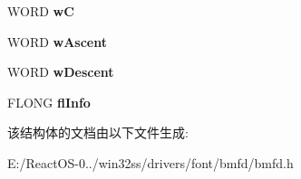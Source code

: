 \begin{DoxyCompactItemize}
W\+O\+RD {\bfseries wC}
\item 
\mbox{\label{struct_b_m_f_d___f_a_c_e_a80c8e617b8ee5163a6fa6d50e58e80d2}} 
W\+O\+RD {\bfseries w\+Ascent}
\item 
\mbox{\label{struct_b_m_f_d___f_a_c_e_a9de517e37955ba9c65bf11d8241448df}} 
W\+O\+RD {\bfseries w\+Descent}
\item 
\mbox{\label{struct_b_m_f_d___f_a_c_e_a82991b7d610a7b451a2a11e4b461bb43}} 
F\+L\+O\+NG {\bfseries fl\+Info}
\end{DoxyCompactItemize}


该结构体的文档由以下文件生成\+:\begin{DoxyCompactItemize}
\item 
E\+:/\+React\+O\+S-\/0../win32ss/drivers/font/bmfd/bmfd.\+h\end{DoxyCompactItemize}
